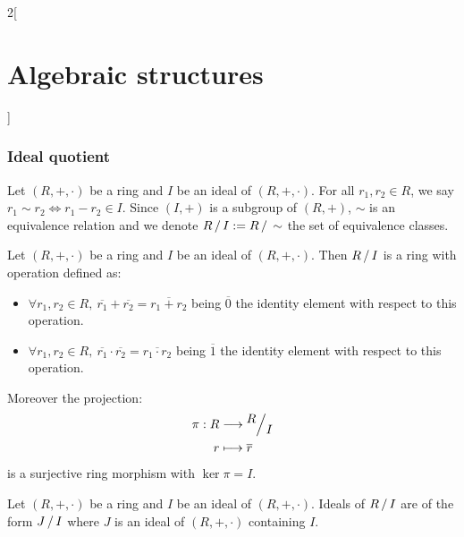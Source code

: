 \documentclass[../../../main.tex]{subfiles}
\begin{document}
\begin{multicols}{2}[\section{Algebraic structures}]
\subsubsection*{Ideal quotient}
\begin{definition}
    Let $(R,+,\cdot)$ be a ring and $I$ be an ideal of $(R,+,\cdot)$. For all $r_1,r_2\in R$, we say $r_1\sim r_2\iff r_1-r_2\in I$. Since $(I,+)$ is a subgroup of $(R,+)$, $\sim$ is an equivalence relation and we denote $\quot{R}{I}:=\quot{R}{\sim}$ the set of equivalence classes.
\end{definition}
\begin{prop}
    Let $(R,+,\cdot)$ be a ring and $I$ be an ideal of $(R,+,\cdot)$. Then $\quot{R}{I}$ is a ring with operation defined as:
    \begin{itemize}
        \item $\forall r_1,r_2\in R,\ \overline{r_1}+\overline{r_2}=\overline{r_1+r_2}$ being $\overline{0}$ the identity element with respect to this operation.
        \item $\forall r_1,r_2\in R,\ \overline{r_1}\cdot\overline{r_2}=\overline{r_1\cdot r_2}$ being $\overline{1}$ the identity element with respect to this operation.
    \end{itemize}
    Moreover the projection:
    \begin{align*}
        \pi:R&\longrightarrow\quot{R}{I}\\
        r&\longmapsto\overline{r}
    \end{align*}
    is a surjective ring morphism with $\ker\pi=I$.
\end{prop}
\begin{corollary}
    Let $(R,+,\cdot)$ be a ring and $I$ be an ideal of $(R,+,\cdot)$. Ideals of $\quot{R}{I}$ are of the form $\quot{J}{I}$ where $J$ is an ideal of $(R,+,\cdot)$ containing $I$.
\end{corollary}

\end{multicols}
\end{document}
